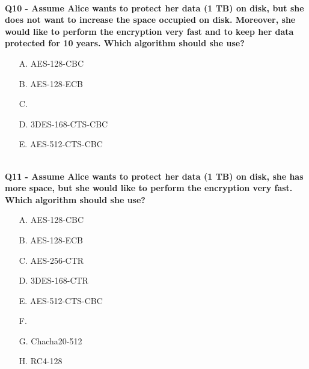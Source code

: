 \textbf{\\Q10 - Assume Alice wants to protect her data (1 TB) on disk, but she does not want to increase the space occupied on disk. Moreover, she would like to perform the encryption very fast and to keep her data protected for 10 years. Which algorithm should she use?}
\begin{enumerate}
	\item[A.] AES-128-CBC
	\item[B.] AES-128-ECB
	\item[C.] 
	\item[D.] 3DES-168-CTS-CBC
	\item[E.] AES-512-CTS-CBC
\end{enumerate}

\textbf{\\Q11 - Assume Alice wants to protect her data (1 TB) on disk, she has more space, but she would like to perform the encryption very fast. Which algorithm should she use?}
\begin{enumerate}
	\item[A.] AES-128-CBC
	\item[B.] AES-128-ECB
	\item[C.] AES-256-CTR
	\item[D.] 3DES-168-CTR
	\item[E.] AES-512-CTS-CBC
	\item[F.] 
	\item[G.] Chacha20-512
	\item[H.] RC4-128
\end{enumerate}

